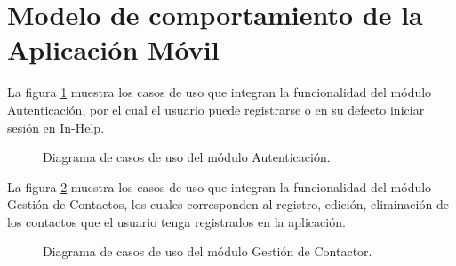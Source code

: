 \newpage
\section{Modelo de comportamiento de la Aplicación Móvil}

La figura \ref{fig:casosUso:aute} muestra los casos de uso que integran la funcionalidad del módulo Autenticación, por el cual el usuario puede registrarse o en su defecto iniciar sesión en In-Help.
%
\begin{figure}[htpb!]
	\begin{center}
		\caption{Diagrama de casos de uso del módulo Autenticación. \label{fig:casosUso:aute}}
	\end{center}
\end{figure}
\clearpage



La figura \ref{fig:casosUso:conta} muestra los casos de uso que integran la funcionalidad del módulo Gestión de Contactos, los cuales corresponden al registro, edición, eliminación de los contactos que el usuario tenga registrados en la aplicación.
%
\begin{figure}[htpb!]
	\begin{center}
		\caption{Diagrama de casos de uso del módulo Gestión de Contactor. \label{fig:casosUso:conta}}
	\end{center}
\end{figure}
\clearpage


